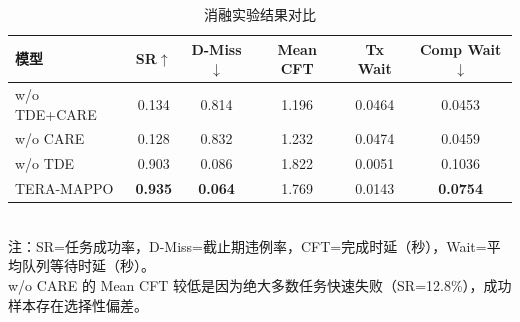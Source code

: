 \begin{table}[htbp]
\centering
\caption{消融实验结果对比}
\label{tab:chap3_ablation}
\begin{tabular}{lccccc}
\toprule
模型 & SR$\uparrow$ & D-Miss$\downarrow$ & Mean CFT & Tx Wait & Comp Wait$\downarrow$ \\
\midrule
w/o TDE+CARE & 0.134 & 0.814 & 1.196 & 0.0464 & 0.0453 \\
w/o CARE     & 0.128 & 0.832 & 1.232 & 0.0474 & 0.0459 \\
w/o TDE      & 0.903 & 0.086 & 1.822 & 0.0051 & 0.1036 \\
TERA-MAPPO   & \textbf{0.935} & \textbf{0.064} & 1.769 & 0.0143 & \textbf{0.0754} \\
\bottomrule
\end{tabular}
\\[4pt]
\footnotesize{注：SR=任务成功率，D-Miss=截止期违例率，CFT=完成时延（秒），Wait=平均队列等待时延（秒）。}\\
\footnotesize{w/o CARE 的 Mean CFT 较低是因为绝大多数任务快速失败（SR=12.8\%），成功样本存在选择性偏差。}
\end{table}